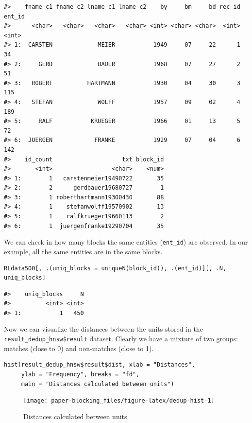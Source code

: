 \begin{verbatim}
#>    fname_c1 fname_c2 lname_c1 lname_c2    by     bm     bd rec_id ent_id
#>      <char>   <char>   <char>   <char> <int> <char> <char>  <int>  <int>
#> 1:  CARSTEN             MEIER           1949     07     22      1     34
#> 2:     GERD             BAUER           1968     07     27      2     51
#> 3:   ROBERT          HARTMANN           1930     04     30      3    115
#> 4:   STEFAN             WOLFF           1957     09     02      4    189
#> 5:     RALF           KRUEGER           1966     01     13      5     72
#> 6:  JUERGEN            FRANKE           1929     07     04      6    142
#>    id_count                    txt block_id
#>       <int>                 <char>    <num>
#> 1:        1   carstenmeier19490722       35
#> 2:        2      gerdbauer19680727        1
#> 3:        1 roberthartmann19300430       88
#> 4:        1    stefanwolff19570902       13
#> 5:        1    ralfkrueger19660113        2
#> 6:        1  juergenfranke19290704       35
\end{verbatim}

We can check in how many blocks the same entities (\texttt{ent\_id}) are observed. In our example, all the same entities are in the same blocks.

\begin{verbatim}
RLdata500[, .(uniq_blocks = uniqueN(block_id)), .(ent_id)][, .N, uniq_blocks]
\end{verbatim}

\begin{verbatim}
#>    uniq_blocks     N
#>          <int> <int>
#> 1:           1   450
\end{verbatim}

Now we can visualize the distances between the units stored in the \linebreak \texttt{result\_dedup\_hnsw\$result} dataset. Clearly we have a mixture of two groups: matches (close to 0) and non-matches (close to 1).

\begin{verbatim}
hist(result_dedup_hnsw$result$dist, xlab = "Distances",
     ylab = "Frequency", breaks = "fd",
     main = "Distances calculated between units")
\end{verbatim}

\begin{figure}[H]

{\centering \texttt{[image: paper-blocking\_files/figure-latex/dedup-hist-1]} 

}

\caption{Distances calculated between units}\label{fig:dedup-hist}
\end{figure}

